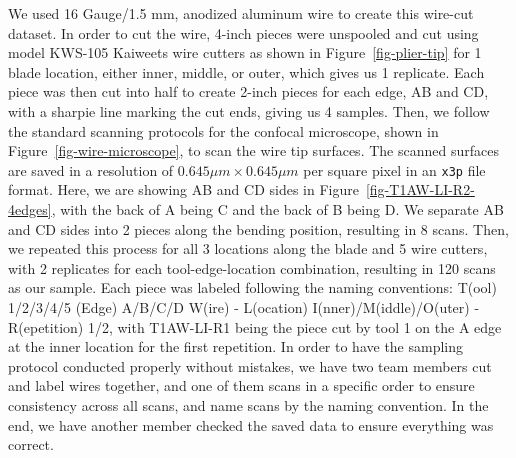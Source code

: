 \documentclass[fleqn,10pt]{wlscirep}
\begin{document}
We used 16 Gauge/1.5 mm, anodized aluminum wire to create this wire-cut
dataset. In order to cut the wire, 4-inch pieces were unspooled and cut
using model KWS-105 Kaiweets wire cutters as shown in
Figure~\ref{fig-plier-tip} for 1 blade location, either inner, middle,
or outer, which gives us 1 replicate. Each piece was then cut into half
to create 2-inch pieces for each edge, AB and CD, with a sharpie line
marking the cut ends, giving us 4 samples. Then, we follow the standard
scanning protocols for the confocal microscope, shown in
Figure~\ref{fig-wire-microscope}, to scan the wire tip surfaces. The
scanned surfaces are saved in a resolution of
\(0.645 \mu m \times 0.645 \mu m\) per square pixel in an \texttt{x3p}
file format. Here, we are showing AB and CD sides in
Figure~\ref{fig-T1AW-LI-R2-4edges}, with the back of A being C and the
back of B being D. We separate AB and CD sides into 2 pieces along the
bending position, resulting in 8 scans. Then, we repeated this process
for all 3 locations along the blade and 5 wire cutters, with 2
replicates for each tool-edge-location combination, resulting in 120
scans as our sample. Each piece was labeled following the naming
conventions: T(ool) 1/2/3/4/5 (Edge) A/B/C/D W(ire) - L(ocation)
I(nner)/M(iddle)/O(uter) - R(epetition) 1/2, with T1AW-LI-R1 being the
piece cut by tool 1 on the A edge at the inner location for the first
repetition. In order to have the sampling protocol conducted properly
without mistakes, we have two team members cut and label wires together,
and one of them scans in a specific order to ensure consistency across
all scans, and name scans by the naming convention. In the end, we have
another member checked the saved data to ensure everything was correct.
\end{document}
